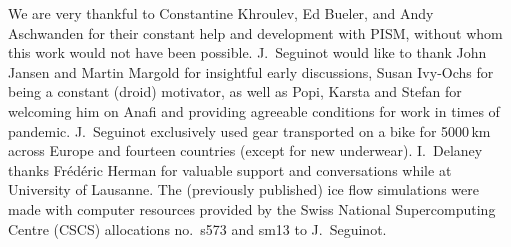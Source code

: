 \documentclass[esurf, manuscript]{copernicus}
\begin{document}





\begin{acknowledgements}
    We are very thankful to Constantine Khroulev, Ed Bueler, and Andy
    Aschwanden for their constant help and development with PISM, without whom
    this work would not have been possible. J.~Seguinot would like to thank
    John Jansen and Martin Margold for insightful early discussions, Susan
    Ivy-Ochs for being a constant (droid) motivator, as well as Popi, Karsta
    and Stefan for welcoming him on Anafi and providing agreeable conditions
    for work in times of pandemic.
    J.~Seguinot exclusively used gear transported on a bike for 5000\,km across
    Europe and fourteen countries (except for new underwear).
    I.~Delaney thanks Fr\'ed\'eric Herman for valuable support and
    conversations while at University of Lausanne.
    The (previously published) ice flow simulations were made with computer
    resources provided by the Swiss National Supercomputing Centre (CSCS)
    allocations no.~s573 and sm13 to J.~Seguinot.
\end{acknowledgements}







\end{document}
